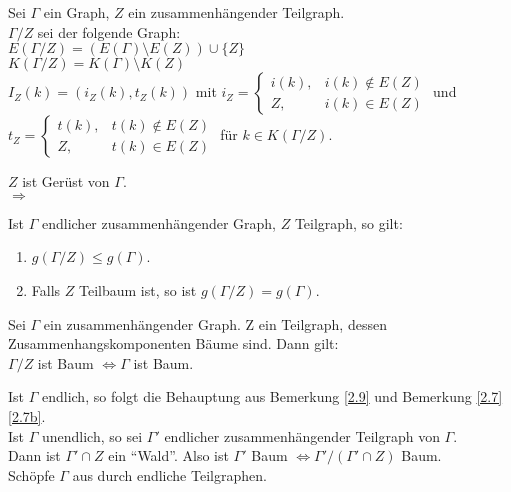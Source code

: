 \documentclass[a4paper, 10pt]{report}
\begin{document}
\begin{DefBem}
Sei $\Gamma$ ein Graph, $Z$ ein zusammenhängender Teilgraph.\\
$\Gamma/Z$ sei der folgende Graph:\\
$E(\Gamma/Z) = (E(\Gamma) \setminus E(Z)) \cup \{Z\}$\\
$K(\Gamma/Z) = K(\Gamma) \setminus K(Z)$\\
$I_Z(k) = (i_Z(k), t_Z(k))$ mit 
$i_Z = \begin{cases}i(k), & i(k) \not\in E(Z)\\ Z, & i(k) \in E(Z)
\end{cases}$ und 
$t_Z = \begin{cases}t(k), & t(k) \not\in E(Z)\\ Z, & t(k) \in E(Z)
\end{cases}$ für $k \in K(\Gamma/Z)$.
\end{DefBem}


\begin{nnBsp} 
$Z$ ist Gerüst von $\Gamma$.\\
$\Rightarrow$
\end{nnBsp}

\begin{Bem}
\label{2.9}
Ist $\Gamma$ endlicher zusammenhängender Graph, $Z$ Teilgraph, so gilt:
\begin{enumerate}
  \item $g(\Gamma/Z) \le g(\Gamma)$.
  \item Falls $Z$ Teilbaum ist, so ist $g(\Gamma/Z) = g(\Gamma)$.
\end{enumerate}
\end{Bem}


\begin{Prop}
Sei $\Gamma$ ein zusammenhängender Graph. Z ein Teilgraph, dessen
Zusammenhangskomponenten Bäume sind. Dann gilt:\\
$\Gamma/Z$ ist Baum $\Leftrightarrow \Gamma$ ist Baum.
\end{Prop}

\begin{Bew}
Ist $\Gamma$ endlich, so folgt die Behauptung aus Bemerkung \ref{2.9} und
Bemerkung \ref*{2.7}\ref{2.7b}.\\
Ist $\Gamma$ unendlich, so sei $\Gamma'$ endlicher zusammenhängender Teilgraph
von $\Gamma$.\\
Dann ist $\Gamma' \cap Z$ ein ``Wald''.
Also ist $\Gamma'$ Baum $\Leftrightarrow \Gamma'/(\Gamma' \cap Z)$ Baum.\\
Schöpfe $\Gamma$ aus durch endliche Teilgraphen.
\end{Bew}
\end{document}
